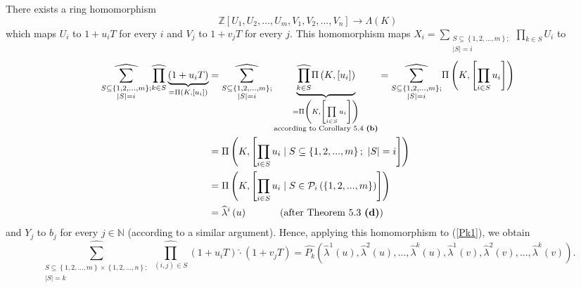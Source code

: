 \documentclass[12pt,final,notitlepage,onecolumn,german]{article}%
\begin{document}
There exists a ring homomorphism%
\[
\mathbb{Z}\left[  U_{1},U_{2},...,U_{m},V_{1},V_{2},...,V_{n}\right]
\rightarrow\Lambda\left(  K\right)
\]
which maps $U_{i}$ to $1+u_{i}T$ for every $i$ and $V_{j}$ to $1+v_{j}T$ for
every $j$. This homomorphism maps $X_{i}=\sum\limits_{\substack{S\subseteq
\left\{  1,2,...,m\right\}  ;\\\left\vert S\right\vert =i}}\prod\limits_{k\in
S}U_{i}$ to%
\begin{align*}
\widehat{\sum\limits_{\substack{S\subseteq\left\{  1,2,...,m\right\}
;\\\left\vert S\right\vert =i}}}\widehat{\prod\limits_{k\in S}}\underbrace
{\left(  1+u_{i}T\right)  }_{=\Pi\left(  K,\left[  u_{i}\right]  \right)  }
&  =\widehat{\sum\limits_{\substack{S\subseteq\left\{  1,2,...,m\right\}
;\\\left\vert S\right\vert =i}}}\underbrace{\widehat{\prod\limits_{k\in S}}%
\Pi\left(  K,\left[  u_{i}\right]  \right)  }_{\substack{=\Pi\left(  K,\left[
\prod\limits_{i\in S}u_{i}\right]  \right)  \\\text{according to Corollary 5.4
\textbf{(b)}}}}=\widehat{\sum\limits_{\substack{S\subseteq\left\{
1,2,...,m\right\}  ;\\\left\vert S\right\vert =i}}}\Pi\left(  K,\left[
\prod\limits_{i\in S}u_{i}\right]  \right) \\
&  =\Pi\left(  K,\left[  \prod\limits_{i\in S}u_{i}\mid S\subseteq\left\{
1,2,...,m\right\}  ;\ \left\vert S\right\vert =i\right]  \right) \\
&  =\Pi\left(  K,\left[  \prod\limits_{i\in S}u_{i}\mid S\in\mathcal{P}%
_{i}\left(  \left\{  1,2,...,m\right\}  \right)  \right]  \right) \\
&  =\widehat{\lambda}^{i}\left(  u\right)  \ \ \ \ \ \ \ \ \ \ \left(
\text{after Theorem 5.3 \textbf{(d)}}\right)
\end{align*}
and $Y_{j}$ to $b_{j}$ for every $j\in\mathbb{N}$ (according to a similar
argument). Hence, applying this homomorphism to (\ref{Pk1}), we obtain%
\[
\widehat{\sum_{\substack{S\subseteq\left\{  1,2,...,m\right\}  \times\left\{
1,2,...,n\right\}  ;\\\left\vert S\right\vert =k}}}\widehat{\prod_{\left(
i,j\right)  \in S}}\left(  1+u_{i}T\right)  \widehat{\cdot}\left(
1+v_{j}T\right)  =\widehat{P_{k}}\left(  \widehat{\lambda}^{1}\left(
u\right)  ,\widehat{\lambda}^{2}\left(  u\right)  ,...,\widehat{\lambda}%
^{k}\left(  u\right)  ,\widehat{\lambda}^{1}\left(  v\right)  ,\widehat
{\lambda}^{2}\left(  v\right)  ,...,\widehat{\lambda}^{k}\left(  v\right)
\right)  .
\]
\end{document}
